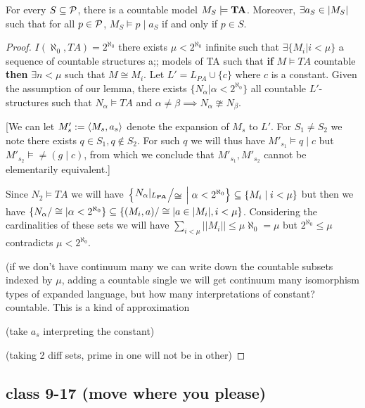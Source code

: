 \begin{boxlemma}
    For every $S \subseteq \mathcal{P}$, there is a countable model $M_S \models \mathbf{TA}$. Moreover, $\exists a_S \in \left\lvert M_S \right\rvert$ such that for all $p \in \mathcal{P}$, $M_S \models p \mid a_S$ if and only if $p \in S$.
\end{boxlemma}
\begin{proof}
    $I(\aleph_0, TA)=2^{\aleph_0}$ there exists $\mu<2^{\aleph_0}$ infinite such that $\exists \{M_i|i<\mu\}$ a sequence of countable structures a;; models of TA such that \textbf{if} $M\models TA$ countable \textbf{then}  $\exists n<\mu$ such that $M\cong M_i$. Let $L'=L_{PA}\cup \{c\}$ where $c$ is a constant. Given the assumption of our lemma, there exists $\{N_{\alpha}|\alpha<2^{\aleph_0}\}$ all countable $L'$-structures such that $N_{\alpha}\models TA$ and $\alpha \neq \beta \implies N_{\alpha}\ncong N_{\beta}$. 

    [We can let $M'_s:=\langle M_s, a_s\rangle$ denote the expansion of $M_s$ to $L'$. For $S_1\neq S_2$ we note there exists $q\in S_1, q \notin S_2$. For such $q$ we will thus have $M'_{s_1}\models q\mid c$ but $M'_{s_2}\models \neq (g\mid c)$, from which we conclude that $M'_{s_1}, M'_{s_2}$ cannot be elementarily equivalent.]

    Since $N_2\models TA$ we will have $\setst{\quotient{N_{\alpha}\rest{L_{\PA}}}{\cong}}{\alpha < 2^{\aleph_0}} \ssq \setst{M_i}{i < \mu}$
    but then we have $\{N_{\alpha}/\cong |\alpha<2^{\aleph_0}\}\subseteq \{ (M_i, a)/\cong|a\in |M_i|, i<\mu\}$. Considering the cardinalities of these sets we will have $\sum_{i<\mu}||M_i||\leq \mu \aleph_0=\mu$ but $2^{\aleph_0}\leq \mu$ contradicts $\mu<2^{\aleph_0}$. \sorry

    (if we don't have continuum many we can write down the countable subsets indexed by $\mu$, adding a countable single we will get continuum many isomorphism types of expanded language, but how many interpretations of constant? countable. This is a kind of approximation

    
     (take $a_s$ interpreting the constant)

    (taking 2 diff sets, prime in one will not be in other)
\end{proof}

\subsection*{class 9-17 (move where you please)}

